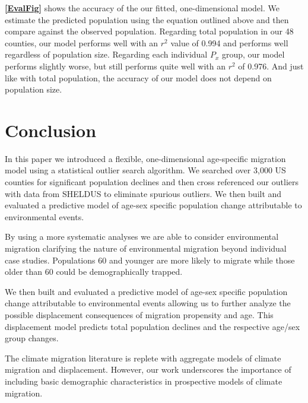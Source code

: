\documentclass[12pt]{article}
\begin{document}
\textbf{\autoref{EvalFig}} shows the accuracy of the our fitted,
one-dimensional model. We estimate the predicted population using the
equation outlined above and then compare against the observed
population. Regarding total population in our 48 counties, our model
performs well with an \(r^2\) value of 0.994 and performs well
regardless of population size. Regarding each individual \(P_x\) group,
our model performs slightly worse, but still performs quite well with an
\(r^2\) of 0.976. And just like with total population, the accuracy of
our model does not depend on population size.

\hypertarget{conclusion}{%
\section{Conclusion}\label{conclusion}}

In this paper we introduced a flexible, one-dimensional age-specific
migration model using a statistical outlier search algorithm. We
searched over 3,000 US counties for significant population declines and
then cross referenced our outliers with data from SHELDUS to eliminate
spurious outliers. We then built and evaluated a predictive model of
age-sex specific population change attributable to environmental events.

By using a more systematic analyses we are able to consider
environmental migration clarifying the nature of environmental migration
beyond individual case studies. Populations 60 and younger are more
likely to migrate while those older than 60 could be demographically
trapped.

We then built and evaluated a predictive model of age-sex specific
population change attributable to environmental events allowing us to
further analyze the possible displacement consequences of migration
propensity and age. This displacement model predicts total population
declines and the respective age/sex group changes.

The climate migration literature is replete with aggregate models of
climate migration and displacement. However, our work underscores the
importance of including basic demographic characteristics in prospective
models of climate migration.

\newpage



\end{document}

